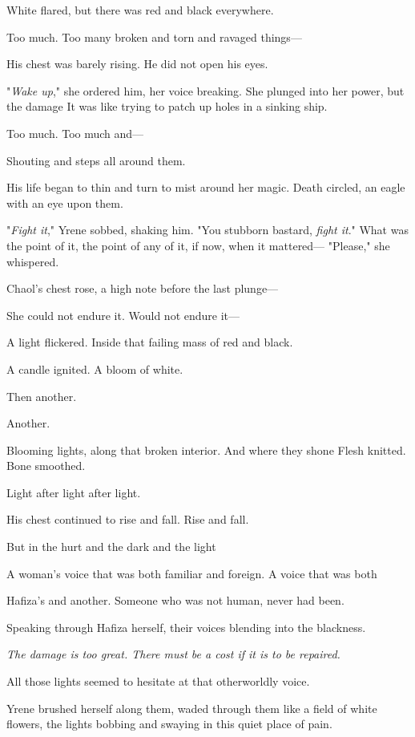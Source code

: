White flared, but there was red and black everywhere.

Too much. Too many broken and torn and ravaged things---

His chest was barely rising. He did not open his eyes.

"\emph{Wake up}," she ordered him, her voice breaking. She plunged into her power, but the damage  It was like trying to patch up holes in a sinking ship.

Too much. Too much and---

Shouting and steps all around them.

His life began to thin and turn to mist around her magic. Death circled, an eagle with an eye upon them.

"\emph{Fight it}," Yrene sobbed, shaking him. "You stubborn bastard,
\emph{fight it}." What was the point of it, the point of any of it, if now, when it mattered--- "Please," she whispered.

Chaol's chest rose, a high note before the last plunge---

She could not endure it. Would not endure it---

A light flickered. Inside that failing mass of red and black.

A candle ignited. A bloom of white.

Then another.

Another.

Blooming lights, along that broken interior. And where they shone
 Flesh knitted. Bone smoothed.

Light after light after light.

His chest continued to rise and fall. Rise and fall.

But in the hurt and the dark and the light 

A woman's voice that was both familiar and foreign. A voice that was both

Hafiza's and  another. Someone who was not human, never had been.

Speaking through Hafiza herself, their voices blending into the blackness.

\emph{The damage is too great. There must be a cost if it is to be repaired.}

All those lights seemed to hesitate at that otherworldly voice.

Yrene brushed herself along them, waded through them like a field of white flowers, the lights bobbing and swaying in this quiet place of pain.

